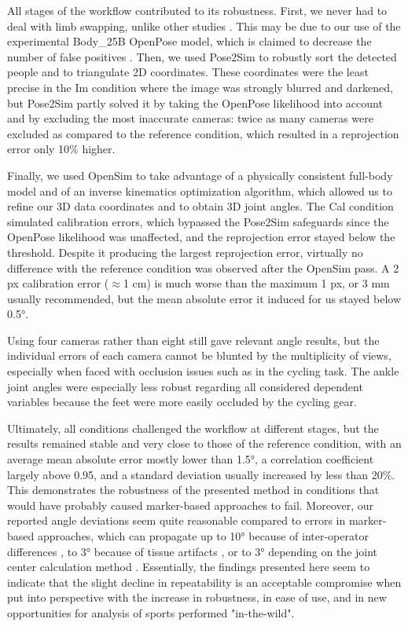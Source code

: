 All stages of the workflow contributed to its robustness. First, we never had to deal with limb swapping, unlike other studies \cite{Nakano2019,Slembrouck2020}. This may be due to our use of the experimental Body\_25B OpenPose model, which is claimed to decrease the number of false positives \cite{Hidalgo2019}. Then, we used Pose2Sim to robustly sort the detected people and to triangulate 2D coordinates. These coordinates were the least precise in the Im condition where the image was strongly blurred and darkened, but Pose2Sim partly solved it by taking the OpenPose likelihood into account and by excluding the most inaccurate cameras: twice as many cameras were excluded as compared to the reference condition, which resulted in a reprojection error only 10\% higher.

Finally, we used OpenSim to take advantage of a physically consistent full-body model and of an inverse kinematics optimization algorithm, which allowed us to refine our 3D data coordinates and to obtain 3D joint angles. The Cal condition simulated calibration errors, which bypassed the Pose2Sim safeguards since the OpenPose likelihood was unaffected, and the reprojection error stayed below the threshold. Despite it producing the largest reprojection error, virtually no difference with the reference condition was observed after the OpenSim pass. A 2 px calibration error ($\approx$1 cm) is much worse than the maximum 1 px, or 3 mm usually recommended, but the mean absolute error it induced for us stayed below 0.5°.

Using four cameras rather than eight still gave relevant angle results, but the individual errors of each camera cannot be blunted by the multiplicity of views, especially when faced with occlusion issues such as in the cycling task. The ankle joint angles were especially less robust regarding all considered dependent variables because the feet were more easily occluded by the cycling gear.

Ultimately, all conditions challenged the workflow at different stages, but the results remained stable and very close to those of the reference condition, with an average mean absolute error mostly lower than 1.5°, a correlation coefficient largely above 0.95, and a standard deviation usually increased by less than 20\%. This demonstrates the robustness of the presented method in conditions that would have probably caused marker-based approaches to fail. Moreover, our reported angle deviations seem quite reasonable compared to errors in marker-based approaches, which can propagate up to 10° because of inter-operator differences \cite{Croce1999,Gorton2009}, to 3° because of tissue artifacts \cite{Benoit2015,Cappozzo1995}, or to 3° depending on the joint center calculation method \cite{Leboeuf2019}. Essentially, the findings presented here seem to indicate that the slight decline in repeatability is an acceptable compromise when put into perspective with the increase in robustness, in ease of use, and in new opportunities for analysis of sports performed "in-the-wild".

